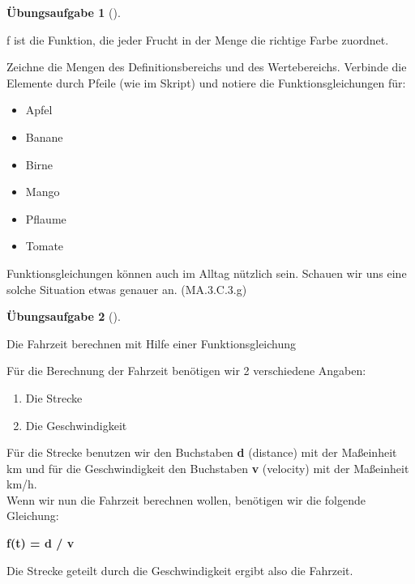 \documentclass[
  10pt,
  a4paper,
  DIV=11]{scrartcl}
\providecommand{\tightlist}{%
  \setlength{\itemsep}{0pt}\setlength{\parskip}{0pt}}\usepackage{longtable,booktabs,array}
\theoremstyle{definition}
\newtheorem{exercise}{Übungsaufgabe}[section]
\theoremstyle{remark}
\begin{document}
\begin{exercise}[]\protect\hypertarget{exr-line}{}\label{exr-line}

f ist die Funktion, die jeder Frucht in der Menge die richtige Farbe
zuordnet.

Zeichne die Mengen des Definitionsbereichs und des Wertebereichs.
Verbinde die Elemente durch Pfeile (wie im Skript) und notiere die
Funktionsgleichungen für:

\begin{itemize}
\tightlist
\item
  Apfel\\
\item
  Banane\\
\item
  Birne\\
\item
  Mango\\
\item
  Pflaume\\
\item
  Tomate
\end{itemize}

Funktionsgleichungen können auch im Alltag nützlich sein. Schauen wir
uns eine solche Situation etwas genauer an. (MA.3.C.3.g)

\end{exercise}

\begin{exercise}[]\protect\hypertarget{exr-line}{}\label{exr-line}

Die Fahrzeit berechnen mit Hilfe einer Funktionsgleichung

Für die Berechnung der Fahrzeit benötigen wir 2 verschiedene Angaben:

\begin{enumerate}
\def\labelenumi{\arabic{enumi}.}
\tightlist
\item
  Die Strecke\\
\item
  Die Geschwindigkeit
\end{enumerate}

Für die Strecke benutzen wir den Buchstaben \textbf{d} (distance) mit
der Maßeinheit km und für die Geschwindigkeit den Buchstaben \textbf{v}
(velocity) mit der Maßeinheit km/h.\\
Wenn wir nun die Fahrzeit berechnen wollen, benötigen wir die folgende
Gleichung:

\textbf{f(t) = d / v}

Die Strecke geteilt durch die Geschwindigkeit ergibt also die Fahrzeit.

\end{exercise}
\end{document}

